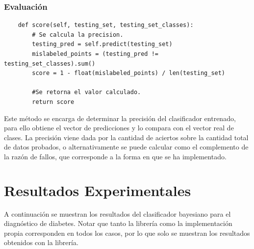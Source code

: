 \documentclass[letter, titlepage, 10pt]{article}
\begin{document}
\subsubsection{Evaluación}
\begin{lstlisting}
    def score(self, testing_set, testing_set_classes):
        # Se calcula la precision.
        testing_pred = self.predict(testing_set)
        mislabeled_points = (testing_pred != testing_set_classes).sum()
        score = 1 - float(mislabeled_points) / len(testing_set)

        #Se retorna el valor calculado.
        return score

\end{lstlisting}

Este método se encarga de determinar la precisión del clasificador entrenado, para ello obtiene el vector de predicciones y lo compara con el vector real de clases. La precisión viene dada por la cantidad de aciertos sobre la cantidad total de datos probados, o alternativamente se puede calcular como el complemento de la razón de fallos, que corresponde a la forma en que se ha implementado.


\newpage

\section{Resultados Experimentales}
A continuación se muestran los resultados del clasificador bayesiano para el diagnóstico de diabetes. Notar que tanto la librería como la implementación propia corresponden en todos los casos, por lo que solo se muestran los resultados obtenidos con la librería.
\end{document}
